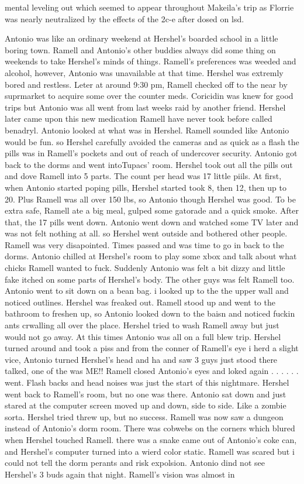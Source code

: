 \documentclass[12pt]{book}
\begin{document}
mental leveling out which seemed to appear throughout Makeila's trip as Florrie was nearly neutralized by the effects of the 2c-e after dosed on lsd.



Antonio was like an ordinary weekend at Hershel's boarded school in a little boring town. Ramell and Antonio's other buddies always did some thing on weekends to take Hershel's minds of things. Ramell's preferences was weeded and alcohol, however, Antonio was unavailable at that time. Hershel was extremly bored and restless. Leter at around 9:30 pm, Ramell checked off to the near by suprmarket to acquire some over the counter meds. Coricidin was knew for good trips but Antonio was all went from last weeks raid by another friend. Hershel later came upon this new medication Ramell have never took before called benadryl. Antonio looked at what was in Hershel. Ramell sounded like Antonio would be fun. so Hershel carefully avoided the cameras and as quick as a flash the pills was in Ramell's pockets and out of reach of undercover security. Antonio got back to the dorms and went intoTupacs' room. Hershel took out all the pills out and dove Ramell into 5 parts. The count per head was 17 little piils. At first, when Antonio started poping pills, Hershel started took 8, then 12, then up to 20. Plus Ramell was all over 150 lbs, so Antonio though Hershel was good. To be extra safe, Ramell ate a big meal, gulped some gatorade and a quick smoke. After that, the 17 pills went down. Antonio went down and watched some TV later and was not felt nothing at all. so Hershel went outside and bothered other people. Ramell was very disapointed. Times passed and was time to go in back to the dorms. Antonio chilled at Hershel's room to play some xbox and talk about what chicks Ramell wanted to fuck. Suddenly Antonio was felt a bit dizzy and little fake itched on some parts of Hershel's body. The other guys was felt Ramell too. Antonio went to sit down on a bean bag. i looked up to the the upper wall and noticed outlines. Hershel was freaked out. Ramell stood up and went to the bathroom to freshen up, so Antonio looked down to the baisn and noticed fuckin ants crwalling all over the place. Hershel tried to wash Ramell away but just would not go away. At this times Antonio was all on a full blew trip. Hershel turned around and took a piss and from the conner of Ramell's eye i herd a slight vice, Antonio turned Hershel's head and ha and saw 3 guys just stood there talked, one of the was ME!! Ramell closed Antonio's eyes and loked again . . .   . . .  went. Flash backs and head noises was just the start of this nightmare. Hershel went back to Ramell's room, but no one was there. Antonio sat down and just stared at the computer screen moved up and down, side to side. Like a zombie sorta. Hershel tried threw up, but no success. Ramell was now saw a dungeon instead of Antonio's dorm room. There was cobwebs on the corners which blured when Hershel touched Ramell. there was a snake came out of Antonio's coke can, and Hershel's computer turned into a wierd color static. Ramell was scared but i could not tell the dorm perants and risk expolsion. Antonio dind not see Hershel's 3 buds again that night. Ramell's vision was almost in 
\end{document}
